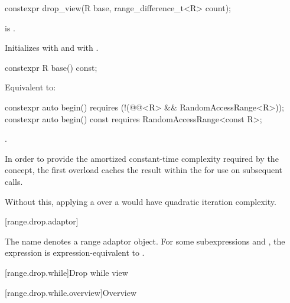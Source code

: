 %
\begin{itemdecl}
constexpr drop_view(R base, range_difference_t<R> count);
\end{itemdecl}

\begin{itemdescr}
\pnum
\expects
{} is .

\pnum
\effects
Initializes  with  and
 with .
\end{itemdescr}

%
\begin{itemdecl}
constexpr R base() const;
\end{itemdecl}

\begin{itemdescr}
\pnum
\effects
Equivalent to: 
\end{itemdescr}

%
\begin{itemdecl}
constexpr auto begin()
  requires (!(@@<R> && RandomAccessRange<R>));
constexpr auto begin() const
  requires RandomAccessRange<const R>;
\end{itemdecl}

\begin{itemdescr}
\pnum
\returns
{}.

\pnum
\remarks
In order to provide the amortized constant-time complexity required
by the  concept,
the first overload caches the result within the 
for use on subsequent calls.
\begin{note}
Without this,
applying a  over a 
would have quadratic iteration complexity.
\end{note}
\end{itemdescr}

[range.drop.adaptor]{}

\pnum
The name  denotes
a range adaptor object.
For some subexpressions  and ,
the expression 
is expression-equivalent to .

[range.drop.while]{Drop while view}

[range.drop.while.overview]{Overview}

